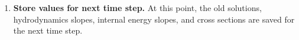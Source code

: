 \begin{enumerate}

\item \textbf{Store values for next time step.}
At this point, the old solutions, hydrodynamics slopes,
internal energy slopes, and cross sections
are saved for the next time step.

\end{enumerate}

